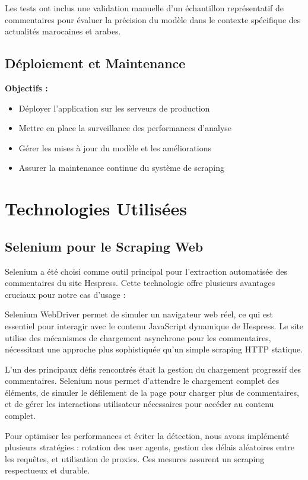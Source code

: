 Les tests ont inclus une validation manuelle d'un échantillon représentatif de commentaires pour évaluer la précision du modèle dans le contexte spécifique des actualités marocaines et arabes.

\subsection{Déploiement et Maintenance}
\textbf{Objectifs :}
\begin{itemize}
    \item Déployer l'application sur les serveurs de production
    \item Mettre en place la surveillance des performances d'analyse
    \item Gérer les mises à jour du modèle et les améliorations
    \item Assurer la maintenance continue du système de scraping
\end{itemize}

\section{Technologies Utilisées}

\subsection{Selenium pour le Scraping Web}
Selenium a été choisi comme outil principal pour l'extraction automatisée des commentaires du site Hespress. Cette technologie offre plusieurs avantages cruciaux pour notre cas d'usage :

Selenium WebDriver permet de simuler un navigateur web réel, ce qui est essentiel pour interagir avec le contenu JavaScript dynamique de Hespress. Le site utilise des mécanismes de chargement asynchrone pour les commentaires, nécessitant une approche plus sophistiquée qu'un simple scraping HTTP statique.

L'un des principaux défis rencontrés était la gestion du chargement progressif des commentaires. Selenium nous permet d'attendre le chargement complet des éléments, de simuler le défilement de la page pour charger plus de commentaires, et de gérer les interactions utilisateur nécessaires pour accéder au contenu complet.

Pour optimiser les performances et éviter la détection, nous avons implémenté plusieurs stratégies : rotation des user agents, gestion des délais aléatoires entre les requêtes, et utilisation de proxies. Ces mesures assurent un scraping respectueux et durable.

